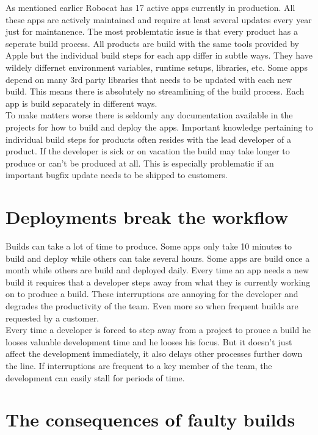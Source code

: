 \documentclass{ituthesis}
\begin{document}
As mentioned earlier Robocat has 17 active apps currently in production. All these apps are actively maintained and require at least several updates every year just for maintanence. The most problemtatic issue is that every product has a seperate build process. All products are build with the same tools provided by Apple but the individual build steps for each app differ in subtle ways. They have wildely differnet environment variables, runtime setups, libraries, etc. Some apps depend on many 3rd party libraries that needs to be updated with each new build. This means there is absolutely no streamlining of the build process. Each app is build separately in different ways. \\

To make matters worse there is seldomly any documentation available in the projects for how to build and deploy the apps. Important knowledge pertaining to individual build steps for products often resides with the lead developer of a product. If the developer is sick or on vacation the build may take longer to produce or can't be produced at all. This is especially problematic if an important bugfix update needs to be shipped to customers.  

\section{Deployments break the workflow}

Builds can take a lot of time to produce. Some apps only take 10 minutes to build and deploy while others can take several hours. Some apps are build once a month while others are build and deployed daily. Every time an app needs a new build it requires that a developer steps away from what they is currently working on to produce a build. These interruptions are annoying for the developer and degrades the productivity of the team. Even more so when frequent builds are requested by a customer.\\

Every time a developer is forced to step away from a project to prouce a build he looses valuable development time and he looses his focus. But it doesn't just affect the development immediately, it also delays other processes further down the line. If interruptions are frequent to a key member of the team, the development can easily stall for periods of time.

\section{The consequences of faulty builds}
\end{document}
